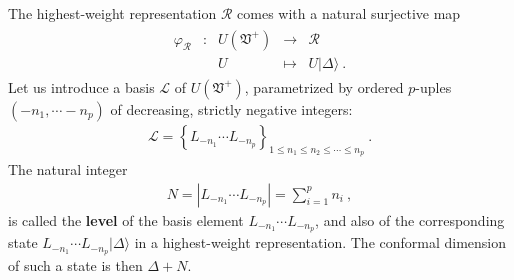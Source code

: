 \documentclass[12pt, a4paper, notitlepage, twoside]{report}
\numberwithin{equation}{section}
\theoremstyle{break}
\begin{document}
The highest-weight representation $\mathcal{R}$
comes with a natural surjective map
\begin{align}
\begin{array}{cclcl}
 \varphi_\mathcal{R} & : & U(\mathfrak{V}^+) & \rightarrow & \mathcal{R} 
\\
 &  & U & \mapsto & U|\Delta\rangle \ .
\end{array}
\label{pur}
\end{align}
Let us introduce a basis $\mathcal{L}$ of $U(\mathfrak{V}^+)$, parametrized by ordered $p$-uples $(-n_1,\cdots -n_p)$ of decreasing, strictly negative integers:
\begin{align}
\mathcal{L} =   \left\{ L_{-n_1} \cdots L_{-n_p}  \right\}_{1\leq n_1\leq n_2\leq \cdots \leq n_p} \ .
\label{lels}
\end{align}
The natural integer
\begin{align}
 N=\left|L_{-n_1} \cdots L_{-n_p}\right|=\sum_{i=1}^p n_i \ ,
\label{nsn}
\end{align}
is called the \textbf{level} of the basis element $L_{-n_1} \cdots L_{-n_p}$, and also of the corresponding state $L_{-n_1} \cdots L_{-n_p}|\Delta\rangle$ in a highest-weight representation.
The conformal dimension of such a state is then $\Delta+N$. 
\end{document}
